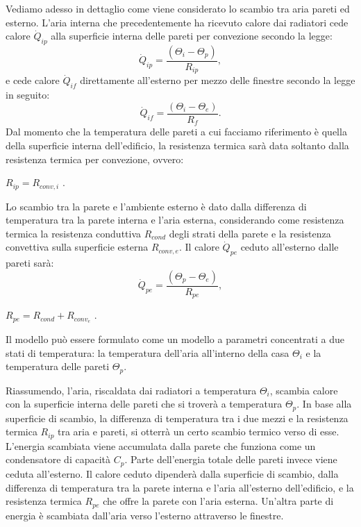 \documentclass[laurea,oneside,11pt]{USiena_tesiLM3}
\begin{document}
Vediamo adesso in dettaglio come viene considerato lo scambio tra aria pareti ed esterno. L'aria interna che precedentemente ha ricevuto calore dai radiatori cede calore $\dot{Q}_{ip}$ alla superficie interna delle pareti per convezione secondo la legge:
\begin{equation}
\dot{Q}_{ip} = \frac{(\Theta_i - \Theta_p)}{R_{ip}} ,
\end{equation} 
e cede calore $\dot{Q}_{if}$  direttamente all'esterno per mezzo delle finestre secondo la legge in seguito:
\begin{equation}
\dot{Q}_{if} = \frac{(\Theta_i - \Theta_e)}{R_{f}} .
\end{equation} 
Dal momento che la temperatura delle pareti a cui facciamo riferimento è quella della superficie interna dell'edificio, la resistenza termica sarà data soltanto dalla resistenza termica per convezione, ovvero:
\begin{center}
$R_{ip} = R_{conv,i}$ .
\end{center}

Lo scambio tra la parete e l'ambiente esterno è dato dalla differenza di temperatura tra la parete interna e l'aria  esterna, considerando come resistenza termica la resistenza conduttiva $R_{cond}$ degli strati della parete e la resistenza convettiva sulla superficie esterna $R_{conv,e}$. Il calore $\dot{Q}_{pe}$ ceduto all'esterno dalle pareti sarà:
\begin{equation}
\dot{Q}_{pe} = \frac{(\Theta_p - \Theta_e)}{R_{pe}}  ,
\end{equation} 
\begin{center}
$R_{pe} = R_{cond} + R_{conv_e}$ .
\end{center}

Il modello può essere formulato come un modello a parametri concentrati a due stati di temperatura: la temperatura dell'aria all'interno della casa $\Theta_i$ e la temperatura delle pareti $\Theta_p$.

Riassumendo, l'aria, riscaldata dai radiatori a temperatura $\Theta_i$, scambia calore con la superficie interna delle pareti che si troverà a temperatura $\Theta_p$. In base alla superficie di scambio, la differenza di temperatura tra i due mezzi e la resistenza termica $R_{ip}$ tra aria e pareti, si otterrà un certo scambio termico verso di esse. L'energia scambiata viene accumulata dalla parete che funziona come un condensatore di capacità $C_p$. Parte dell'energia totale delle pareti invece viene ceduta all'esterno. Il calore ceduto dipenderà dalla superficie di scambio, dalla differenza di temperatura tra la parete interna e l'aria all'esterno dell'edificio, e la resistenza termica $R_{pe}$ che offre la parete con l'aria esterna. Un'altra parte di energia è scambiata dall'aria verso l'esterno attraverso le finestre.  
\end{document}
